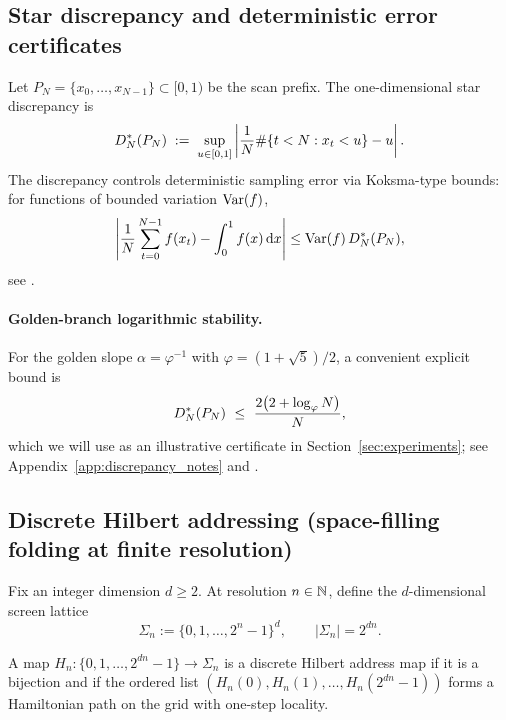 \subsection{Star discrepancy and deterministic error certificates}
\label{sec:discrepancy_certificates}

Let $P_N=\{x_0,\dots,x_{N-1}\}\subset[0,1)$ be the scan prefix.
The one-dimensional star discrepancy is
\begin{equation}
\label{eq:star_discrepancy_1d}
D_N^\ast(P_N)
\;:=\;
\sup_{u\in[0,1]}
\left|
\frac{1}{N}\#\{t<N: x_t<u\}-u
\right|.
\end{equation}
The discrepancy controls deterministic sampling error via Koksma-type bounds:
for functions of bounded variation $\mathrm{Var}(f)$,
\begin{equation}
\label{eq:koksma}
\left|
\frac{1}{N}\sum_{t=0}^{N-1} f(x_t)-\int_0^1 f(x)\,\mathrm{d} x
\right|
\le \mathrm{Var}(f)\,D_N^\ast(P_N),
\end{equation}
see \cite{KuipersNiederreiter1974,DrmotaTichy1997}.

\paragraph{Golden-branch logarithmic stability.}
For the golden slope $\alpha=\varphi^{-1}$ with $\varphi=(1+\sqrt 5)/2$, a convenient explicit bound is
\begin{equation}
\label{eq:golden_bound}
D_N^\ast(P_N)\ \le\ \frac{2\bigl(2+\log_\varphi N\bigr)}{N},
\end{equation}
which we will use as an illustrative certificate in Section~\ref{sec:experiments}; see Appendix~\ref{app:discrepancy_notes} and \cite{KuipersNiederreiter1974,DrmotaTichy1997}.

\subsection{Discrete Hilbert addressing (space-filling folding at finite resolution)}
\label{sec:hilbert_addressing_prelim}

Fix an integer dimension $d\ge 2$.
At resolution $n\in\mathbb{N}$, define the $d$-dimensional screen lattice
\begin{equation}
\label{eq:screen_lattice}
\Sigma_n := \{0,1,\dots,2^n-1\}^d,
\qquad |\Sigma_n|=2^{dn}.
\end{equation}

\begin{definition}
\label{def:hilbert_address}
A map $H_n:\{0,1,\dots,2^{dn}-1\}\to \Sigma_n$ is a discrete Hilbert address map if it is a bijection and if the ordered list
$(H_n(0),H_n(1),\dots,H_n(2^{dn}-1))$ forms a Hamiltonian path on the grid with one-step locality.
\end{definition}

